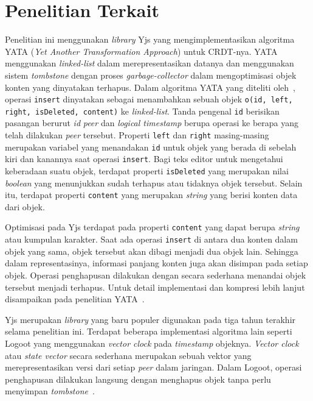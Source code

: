\section{Penelitian Terkait}
\label{sec:penelitian_terkait}

Penelitian ini menggunakan \textit{library} Yjs yang mengimplementasikan algoritma YATA (\textit{Yet Another Transformation Approach}) untuk CRDT-nya. YATA menggunakan \textit{linked-list} dalam merepresentasikan datanya dan menggunakan sistem \textit{tombstone} dengan proses \textit{garbage-collector} dalam mengoptimisasi objek konten yang dinyatakan terhapus. Dalam algoritma YATA yang diteliti oleh~\cite{Nicolaescu2016yjs}, operasi \texttt{insert} dinyatakan sebagai menambahkan sebuah objek \texttt{o(id, left, right, isDeleted, content)} ke \textit{linked-list}. Tanda pengenal \texttt{id} berisikan pasangan berurut \textit{id} \textit{peer} dan \textit{logical timestamp} berupa operasi ke berapa yang telah dilakukan \textit{peer} tersebut. Properti \texttt{left} dan \texttt{right} masing-masing merupakan variabel yang menandakan \texttt{id} untuk objek yang berada di sebelah kiri dan kanannya saat operasi \texttt{insert}. Bagi teks editor untuk mengetahui keberadaan suatu objek, terdapat properti \texttt{isDeleted} yang merupakan nilai \textit{boolean} yang menunjukkan sudah terhapus atau tidaknya objek tersebut. Selain itu, terdapat properti \texttt{content} yang merupakan \textit{string} yang berisi konten data dari objek.

Optimisasi pada Yjs terdapat pada properti \texttt{content} yang dapat berupa \textit{string} atau kumpulan karakter. Saat ada operasi \texttt{insert} di antara dua konten dalam objek yang sama, objek tersebut akan dibagi menjadi dua objek lain. Sehingga dalam representasinya, informasi panjang konten juga akan disimpan pada setiap objek. Operasi penghapusan dilakukan dengan secara sederhana menandai objek tersebut menjadi terhapus. Untuk detail implementasi dan kompresi lebih lanjut disampaikan pada penelitian YATA~\citep{Nicolaescu2016yjs}.

Yjs merupakan \textit{library} yang baru populer digunakan pada tiga tahun terakhir selama penelitian ini. Terdapat beberapa implementasi algoritma lain seperti Logoot yang menggunakan \textit{vector clock} pada \textit{timestamp} objeknya. \textit{Vector clock} atau \textit{state vector} secara sederhana merupakan sebuah vektor yang merepresentasikan versi dari setiap \textit{peer} dalam jaringan. Dalam Logoot, operasi penghapusan dilakukan langsung dengan menghapus objek tanpa perlu menyimpan \textit{tombstone}~\citep{weiss2009logoot}.

